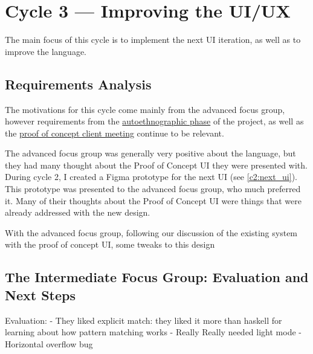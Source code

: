\chapter{Cycle 3 --- Improving the UI/UX}
The main focus of this cycle is to implement the next UI iteration, as well as to improve the language. 

\section{Requirements Analysis}
The motivations for this cycle come mainly from the advanced focus group, however requirements from the \hyperref[sec:c1_autoethnography]{autoethnographic phase} of the project, as well as the \hyperref[eval:c1]{proof of concept client meeting} continue to be relevant. 

The advanced focus group was generally very positive about the language, but they had many thought about the Proof of Concept UI they were presented with. During cycle 2, I created a Figma prototype for the next UI (see \ref{c2:next_ui}). This prototype was presented to the advanced focus group, who much preferred it. Many of their thoughts about the Proof of Concept UI were things that were already addressed with the new design. 

With the advanced focus group, following our discussion of the existing system with the proof of concept UI, some tweaks to this design 


\section{The Intermediate Focus Group: Evaluation and Next Steps}
\label{eval:IFG}
Evaluation:
- They liked explicit match: they liked it more than haskell for learning about how pattern matching works
- Really Really needed light mode
- Horizontal overflow bug